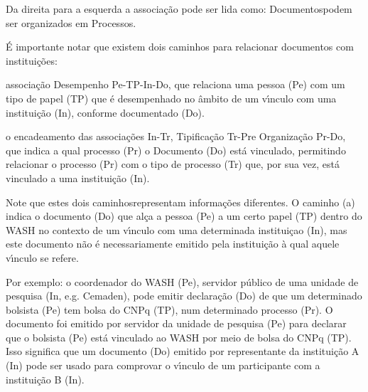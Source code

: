 \documentclass[
12pt,		%
openright,	%
twoside,  %
a4paper,			%
chapter=TITLE,		%
english,			%
french,				%
spanish,			%
brazil				%
]{USPSC-classe/USPSC}
\begin{document}
Da direita para a esquerda a associa\c{c}\~ao pode ser lida como: \textquotedbl Documentos\textquotedbl  podem ser organizados em \textquotedbl Processos\textquotedbl .










\'E importante notar que existem dois caminhos para relacionar documentos com institui\c{c}\~oes:











\begin{alineas}
\item associa\c{c}\~ao \textquotedbl Desempenho Pe-TP-In-Do\textquotedbl , que relaciona uma pessoa (Pe) com um tipo de papel (TP) que \'e desempenhado no \^ambito de um v\'{\i}nculo com uma institui\c{c}\~ao (In), conforme documentado 
(Do).
\item o encadeamento das associa\c{c}\~oes \textquotedbl In-Tr\textquotedbl , \textquotedbl Tipifica\c{c}\~ao Tr-Pr\textquotedbl  e \textquotedbl Organiza\c{c}\~ao Pr-Do\textquotedbl , que indica a qual processo (Pr) o Documento (Do) est\'a vinculado, permitindo relacionar o processo (Pr) com o tipo de processo (Tr) que, por sua vez, est\'a vinculado a uma institui\c{c}\~ao (In).
\end{alineas}

Note que estes dois \textquotedbl caminhos\textquotedbl  representam informa\c{c}\~oes diferentes. O caminho (a) indica o documento (Do) que al\c{c}a a pessoa (Pe) a um certo papel (TP) dentro do WASH no contexto de um v\'{\i}nculo com uma determinada institui\c{c}ao (In), mas este documento n\~ao \'e necessariamente emitido pela institui\c{c}\~ao \`a qual aquele v\'{\i}nculo se refere.










Por exemplo: o coordenador do WASH (Pe), servidor p\'ublico de uma unidade de pesquisa (In, e.g. Cemaden), pode emitir declara\c{c}\~ao (Do) de que um determinado bolsista (Pe) tem bolsa do CNPq (TP), num determinado processo (Pr). O documento foi emitido por servidor da unidade de pesquisa (Pe) para declarar que o bolsista (Pe) est\'a vinculado ao WASH por meio de bolsa do CNPq (TP). Isso significa que um documento (Do) emitido por representante da institui\c{c}\~ao A (In) pode ser usado para comprovar o v\'{\i}nculo de um participante com a institui\c{c}\~ao B (In).
\end{document}
